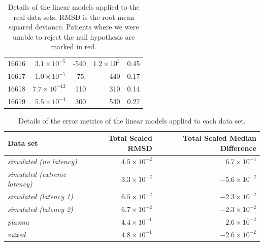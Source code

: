 \documentclass[12pt]{article}
\begin{document}
\begin{table}[!ht]
\begin{center}
\begin{tabular}{lrrrr}
16616 & $3.1 \times 10^{-5}$ & -540 & $1.2 \times 10^{3}$ & 0.45 \\
16617 & $1.0 \times 10^{-7}$ & 75. & 440 & 0.17 \\
16618 & $7.7 \times 10^{-12}$ & 110 & 310 & 0.14 \\
16619 & $5.5 \times 10^{-4}$ & 300 & 540 & 0.27 \\
\hline
\end{tabular}
\end{center}
  \caption{Details of the linear models applied to the real data sets. RMSD is the root mean squared deviance. Patients where we were unable to reject the null hypothesis are marked in red.
   }\label{tab:patientserror} 
\end{table}

\begin{table}[!ht]
\def\arraystretch{1.3}%
\begin{center}
\begin{tabular}{lrr}
Data set & Total Scaled RMSD & Total Scaled Median Difference \\ %
\hline
\emph{simulated (no latency)} & $4.5 \times 10^{-2}$ & $6.7 \times 10^{-4}$ \\%
\emph{simulated (extreme latency)} & $3.3 \times 10^{-2}$ & $-5.6 \times 10^{-2}$ \\ %
\emph{simulated (latency 1)} & $6.5 \times 10^{-2}$ & $-2.3 \times 10^{-2}$ \\ %
\emph{simulated (latency 2)} & $6.7 \times 10^{-2}$ & $-2.3 \times 10^{-2}$ \\ %
\emph{plasma} & $4.4 \times 10^{-1}$ & $2.6 \times 10^{-2}$ \\ %
\emph{mixed} & $4.8 \times 10^{-1}$ & $-2.6 \times 10^{-2}$ \\ %
\hline
\end{tabular}
\end{center}
 \caption{Details of the error metrics of the linear models applied to each data set.
 }\label{tab:error} 
\end{table}
\end{document}
